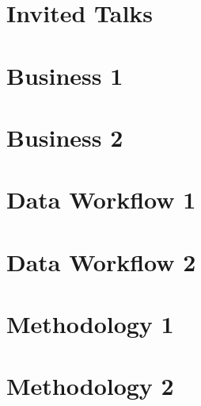 \documentclass[11pt,oneside]{book}
\begin{document}
\mainmatter

\chapter{Invited Talks}











\chapter{Business 1}

% 




\chapter{Business 2}






\chapter{Data Workflow 1}






\chapter{Data Workflow 2}





\chapter{Methodology 1}




\chapter{Methodology 2}





\end{document}
